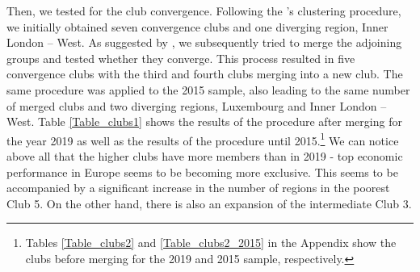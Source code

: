 \documentclass[11pt]{article}
\begin{document}
Then, we tested for the club convergence. Following the \citeauthor{phillips2007transition}'s clustering procedure, we initially obtained seven convergence clubs and one diverging region, Inner London – West. As suggested by \citet{bartkowska2012regional}, we subsequently tried to merge the adjoining groups and tested whether they converge. This process resulted in five convergence clubs with the third and fourth clubs merging into a new club. The same procedure was applied to the 2015 sample, also leading to the same number of merged clubs and two diverging regions, Luxembourg and Inner London – West. Table \ref{Table_clubs1} shows the results of the procedure after merging for the year 2019 as well as the results of the \citeauthor{phillips2007transition} procedure until 2015.\footnote{Tables \ref{Table_clubs2} and \ref{Table_clubs2_2015} in the Appendix show the clubs before merging for the 2019 and 2015 sample, respectively.}  We can notice above all that the higher clubs have more members than in 2019 - top economic performance in Europe seems to be becoming more exclusive. This seems to be accompanied by a significant increase in the number of regions in the poorest Club 5. On the other hand, there is also an expansion of the intermediate Club 3.
\end{document}

